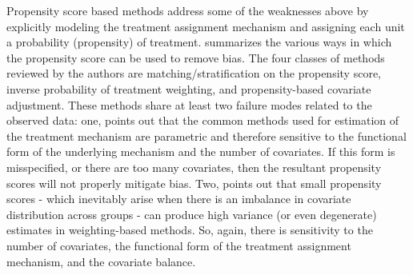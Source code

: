 \documentclass[../main.tex]{subfiles}
\begin{document}
\vspace{\baselineskip}
Propensity score based methods address some of the weaknesses above by explicitly modeling the treatment assignment mechanism and assigning each unit a probability (propensity) of treatment. \cite{Austin2011AnStudies} summarizes the various ways in which the propensity score can be used to remove bias. The four classes of methods reviewed by the authors are matching/stratification on the propensity score, inverse probability of treatment weighting, and propensity-based covariate adjustment. These methods share at least two failure modes related to the observed data: one, \cite{Hill2011BayesianInference} points out that the common methods used for estimation of the treatment mechanism are parametric and therefore sensitive to the functional form of the underlying mechanism and the number of covariates. If this form is misspecified, or there are too many covariates, then the resultant propensity scores will not properly mitigate bias. Two, \cite{Knaus2018MachineEvidence} points out that small propensity scores - which inevitably arise when there is an imbalance in covariate distribution across groups - can produce high variance (or even degenerate) estimates in weighting-based methods. So, again, there is sensitivity to the number of covariates, the functional form of the treatment assignment mechanism, and the covariate balance.\par
\end{document}
